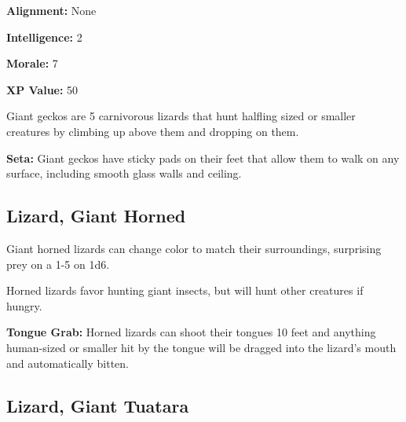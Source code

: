 \begin{multicols*}{2}
{\textbf{Alignment:} None

\textbf{Intelligence:} 2

\textbf{Morale:} 7

\textbf{XP Value:} 50}

Giant geckos are 5 carnivorous lizards that hunt halfling sized or smaller creatures by climbing up above them and dropping on them.

\textbf{Seta:} Giant geckos have sticky pads on their feet that allow them to walk on any surface, including smooth glass walls and ceiling.

\subsection{Lizard, Giant Horned}

Giant horned lizards can change color to match their surroundings, surprising prey on a 1-5 on 1d6.

Horned lizards favor hunting giant insects, but will hunt other creatures if hungry.

\textbf{Tongue Grab:} Horned lizards can shoot their tongues 10 feet and anything human-sized or smaller hit by the tongue will be dragged into the lizard's mouth and automatically bitten.

\subsection{Lizard, Giant Tuatara}
\end{multicols*}
